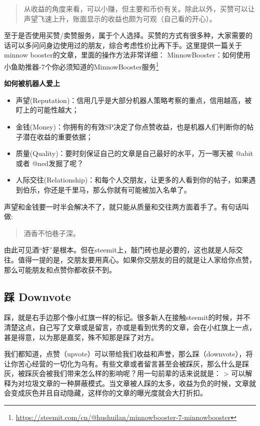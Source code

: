 \documentclass[]{ctexbook}
\renewcommand{\href}[2]{#2\footnote{\url{#1}}}
\begin{document}
\begin{quote}
从收益的角度来看，可以小赚，但主要和币价有关。除此以外，买赞可以让声望飞速上升，账面显示的收益也颇为可观（自己看的开心）。
\end{quote}

至于是否使用买赞/卖赞服务，属于个人选择。买赞的方式有很多种，大家需要的话可以多问问身边使用过的朋友，综合考虑性价比再下手。这里提供一篇关于minnow booster的文章，里面的操作方法非常详细：
\href{https://steemit.com/cn/@hushuilan/minnowbooster-7-minnowbooster}{MinnowBooster：如何使用小鱼助推器-7个你必须知道的MinnowBooster服务}

\textbf{如何被机器人爱上}

\begin{itemize}
\item
  声望(Reputation)：信用几乎是大部分机器人策略考察的重点，信用越高，被盯上的可能性越大；
\item
  金钱(Money)：你拥有的有效SP决定了你点赞收益，也是机器人们判断你的帖子潜在收益的重要依据；
\item
  质量(Quality)：要时刻保证自己的文章是自己最好的水平，万一哪天被 @abit或者 @ned发掘了呢？
\item
  人际交往(Relationship)：和每个人交朋友，让更多的人看到你的帖子，如果遇到伯乐，你还是千里马，那么你就有可能被加入名单了。
\end{itemize}

声望和金钱要一时半会解决不了，就只能从质量和交往两方面着手了。有句话叫做:

\begin{quote}
酒香不怕巷子深。
\end{quote}

由此可见酒``好''是根本。但在steemit上，敲门砖也是必要的，这也就是人际交往。值得一提的是，交朋友要用真心。如果你交朋友的目的就是让人家给你点赞，那么可能朋友和点赞你都收获不到。

\hypertarget{-downvote}{%
\subsection{踩 Downvote}\label{-downvote}}

踩，就是右手边那个像小红旗一样的标记。很多新人在接触steemit的时候，并不清楚这点，自己写了文章或是留言，亦或是看到优秀的文章，会在小红旗上一点，甚是得意，以为那是嘉奖，殊不知那是踩了对方。

我们都知道，点赞（upvote）可以带给我们收益和声誉，那么踩（downvote），将让你苦心经营的一切化为乌有。有些文章或者留言甚至会被踩灰，那么什么是踩灰，被踩灰会被我们带来怎么样的影响呢？用一句前辈的话来说就是：
\textgreater{} 可以解释为对垃圾文章的一种屏蔽模式。当文章被人踩的太多，收益为负的时候，文章就会变成灰色并且自动隐藏，这样你的文章的曝光度就会大打折扣。
\end{document}
